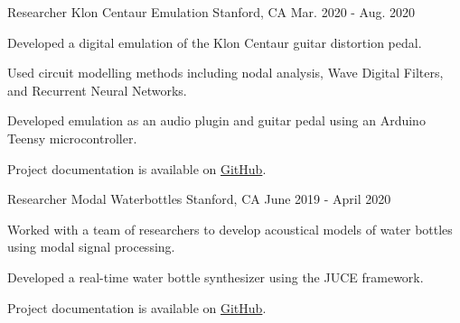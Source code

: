 
\begin{cventries}

    \cventry
    {Researcher} %
    {Klon Centaur Emulation} %
    {Stanford, CA} %
    {Mar. 2020 - Aug. 2020} %
    {
      \begin{cvitems} %
        \item {Developed a digital emulation of the Klon Centaur guitar distortion pedal.}
        \item {Used circuit modelling methods including nodal analysis, Wave Digital Filters, and Recurrent Neural Networks.}
        \item {Developed emulation as an audio plugin and guitar pedal using an Arduino Teensy microcontroller.}
        \item {Project documentation is available on \href{https://github.com/jatinchowdhury18/KlonCentaur}{GitHub}.}
      \end{cvitems}
    }

    \cventry
    {Researcher} %
    {Modal Waterbottles} %
    {Stanford, CA} %
    {June 2019 - April 2020} %
    {
      \begin{cvitems} %
        \item {Worked with a team of researchers to develop acoustical
               models of water bottles using modal signal processing.}
        \item {Developed a real-time water bottle synthesizer using the JUCE framework.}
        \item {Project documentation is available on \href{https://github.com/jatinchowdhury18/modal-waterbottles}{GitHub}.}
      \end{cvitems}
    }


\end{cventries}
